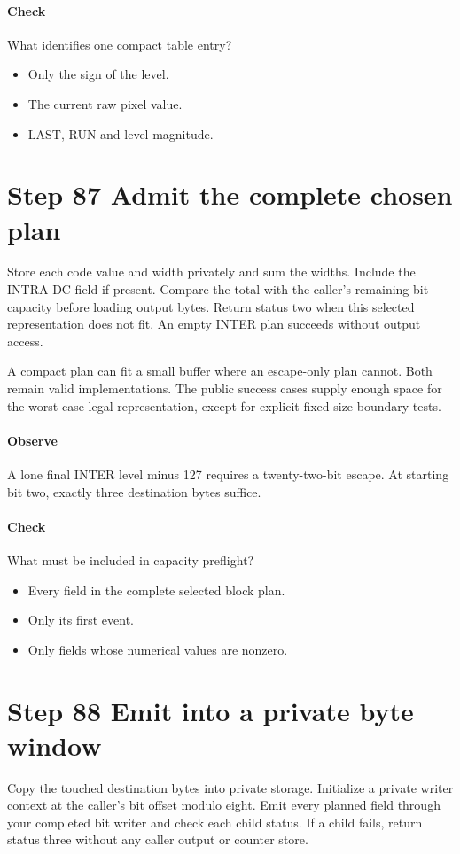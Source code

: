 \paragraph{Check} What identifies one compact table entry?
\begin{itemize}
  \item[A.] Only the sign of the level.
  \item[B.] The current raw pixel value.
  \item[C.] LAST, RUN and level magnitude.
\end{itemize}

\section{Step 87 Admit the complete chosen plan}\label{h263-coeff-s07}
Store each code value and width privately and sum the widths. Include the INTRA
DC field if present. Compare the total with the caller's remaining bit capacity
before loading output bytes. Return status two when this selected representation
does not fit. An empty INTER plan succeeds without output access.

A compact plan can fit a small buffer where an escape-only plan cannot. Both
remain valid implementations. The public success cases supply enough space for
the worst-case legal representation, except for explicit fixed-size boundary tests.

\paragraph{Observe} A lone final INTER level minus 127 requires a twenty-two-bit
escape. At starting bit two, exactly three destination bytes suffice.
\paragraph{Check} What must be included in capacity preflight?
\begin{itemize}
  \item[A.] Every field in the complete selected block plan.
  \item[B.] Only its first event.
  \item[C.] Only fields whose numerical values are nonzero.
\end{itemize}

\section{Step 88 Emit into a private byte window}\label{h263-coeff-s08}
Copy the touched destination bytes into private storage. Initialize a private
writer context at the caller's bit offset modulo eight. Emit every planned field
through your completed bit writer and check each child status. If a child fails,
return status three without any caller output or counter store.

